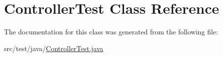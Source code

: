 \hypertarget{class_controller_test}{}\section{Controller\+Test Class Reference}
\label{class_controller_test}


The documentation for this class was generated from the following file\+:\begin{DoxyCompactItemize}
\item 
src/test/java/\mbox{\hyperlink{_controller_test_8java}{Controller\+Test.\+java}}\end{DoxyCompactItemize}
